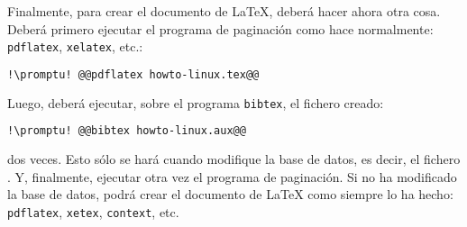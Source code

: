 Finalmente, para crear el documento de \LaTeX{}, deberá hacer ahora otra cosa. Deberá primero ejecutar el
programa de paginación como hace normalmente: \lstinline+pdflatex+, \lstinline+xelatex+, etc.:

\begin{lstlisting}[gobble=2,language=bash,style=bashinteract,escapechar=!]
  !\promptu! @@pdflatex howto-linux.tex@@
\end{lstlisting}

\noindent Luego, deberá ejecutar, sobre el programa \lstinline+bibtex+, el fichero  creado:

\begin{lstlisting}[gobble=2,language=bash,style=bashinteract,escapechar=!]
  !\promptu! @@bibtex howto-linux.aux@@
\end{lstlisting}

\noindent dos veces. Esto sólo se hará cuando modifique la base de datos, es decir, el fichero . Y,
finalmente, ejecutar otra vez el programa de paginación. Si no ha modificado la base de datos, podrá crear el
documento de \LaTeX{} como siempre lo ha hecho: \lstinline+pdflatex+, \lstinline+xetex+, \lstinline+context+,
etc.
